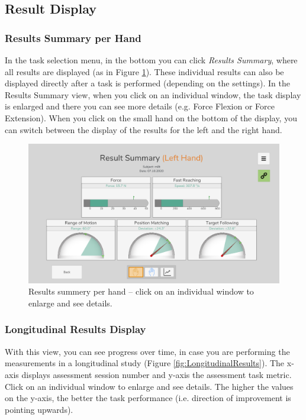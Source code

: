 \documentclass[10pt,oneside,a4paper]{article}
\begin{document}
\subsection{Result Display}
\subsubsection{Results Summary per Hand}
In the task selection menu, in the bottom you can click \emph{Results Summary}, where all results are displayed (as in Figure \ref{fig:ResultSummaryHand}). These individual results can also be displayed directly after a task is performed (depending on the settings). In the Results Summary view, when you click on an individual window, the task display is enlarged and there you can see more details (e.g. Force Flexion or Force Extension). When you click on the small hand on the bottom of the display, you can switch between the display of the results for the left and the right hand. 

\begin{figure}[h!]
\begin{center}
\includegraphics[width=\columnwidth]{images/Assessments/ResultsSummary.png}
\caption{Results summery per hand – click on an individual window to enlarge and see details.}
\label{fig:ResultSummaryHand}
\end{center}
\end{figure}

\subsubsection{Longitudinal Results Display} \label{sec:longResults}
With this view, you can see progress over time, in case you are performing the measurements in a longitudinal study (Figure \ref{fig:LongitudinalResults}). The x-axis displays assessment session number and y-axis the assessment task metric. Click on an individual window to enlarge and see details. The higher the values on the y-axis, the better the task performance (i.e. direction of improvement is pointing upwards).  
\end{document}
